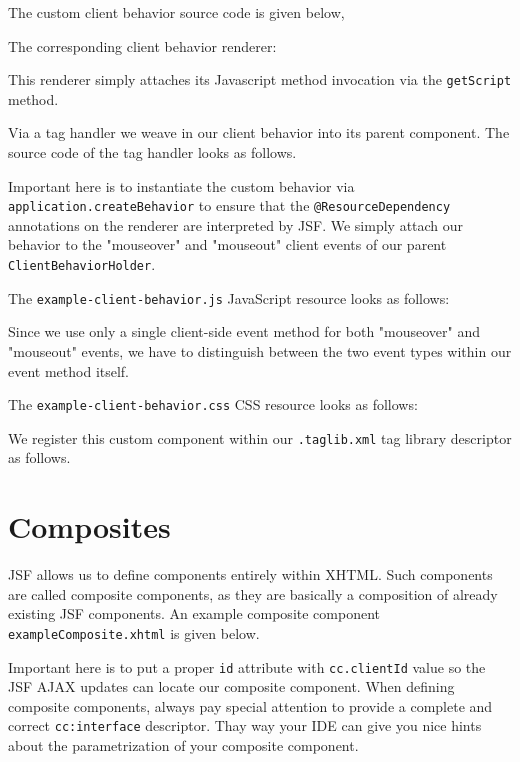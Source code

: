 The custom client behavior source code is given below,


The corresponding client behavior renderer:

This renderer simply attaches its Javascript method invocation via the \texttt{getScript} method.

Via a tag handler we weave in our client behavior into its parent component.
The source code of the tag handler looks as follows.

Important here is to instantiate the custom behavior via \texttt{application.createBehavior} to ensure that the \texttt{@ResourceDependency} annotations on the renderer are interpreted by JSF.
We simply attach our behavior to the "mouseover" and "mouseout" client events of our parent \texttt{ClientBehaviorHolder}.

The \texttt{example-client-behavior.js} JavaScript resource looks as follows:

Since we use only a single client-side event method for both "mouseover" and "mouseout" events, we have to distinguish between the two event types within our event method itself.

The \texttt{example-client-behavior.css} CSS resource looks as follows:


We register this custom component within our \texttt{.taglib.xml} tag library descriptor as follows.


\section{Composites}
JSF allows us to define components entirely within XHTML.
Such components are called composite components, as they are basically a composition of already existing JSF components.
An example composite component \texttt{exampleComposite.xhtml} is given below.

Important here is to put a proper \texttt{id} attribute with \texttt{cc.clientId} value so the JSF AJAX updates can locate our composite component.
When defining composite components, always pay special attention to provide a complete and correct \texttt{cc:interface} descriptor.
Thay way your IDE can give you nice hints about the parametrization of your composite component.

